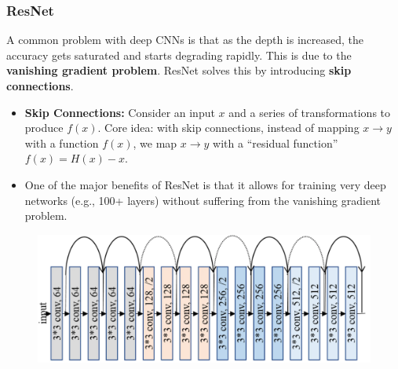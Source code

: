 \subsubsection*{ResNet}

A common problem with deep CNNs is that as the depth is increased, the accuracy gets saturated and starts degrading rapidly. This is due to the \textbf{vanishing gradient problem}. ResNet solves this by introducing \textbf{skip connections}.

\begin{itemize}
  
  \item \textbf{Skip Connections:} Consider an input $x$ and a series of transformations to produce $f(x)$. Core idea: with skip connections, instead of mapping $x \rightarrow y$ with a function $f(x)$, we map $x \rightarrow y$ with a \enquote{residual function} $f(x) = H(x) - x$.

  \item One of the major benefits of ResNet is that it allows for training very deep networks (e.g., 100+ layers) without suffering from the vanishing gradient problem.

\end{itemize}

\begin{figure}[H]
  \centering
  \includegraphics[width=\linewidth]{images/resnet.png}
\end{figure}
